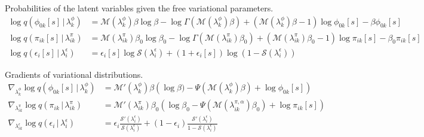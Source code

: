 \documentclass{article}
\newcommand{\g}{\, | \,}
\begin{document}
Probabilities of the latent variables given the free variational parameters.
\begin{align}
\log q(\phi_{0k}[s] \g \lambda^\phi_k) &= \mathcal{M}(\lambda^{\phi}_k)\beta \log \beta - \log\Gamma( \mathcal{M}(\lambda^{\phi}_k)\beta) + ( \mathcal{M}(\lambda^{\phi}_k)\beta - 1) \log \phi_{0k}[s] -  \beta \phi_{0k}[s] \label{eq:logq.phi.v3}\\
\log q(\pi_{ik}[s] \g \lambda^\pi_{ik}) &= \mathcal{M}(\lambda^{\pi}_{ik})\beta_0 \log\beta_0 - \log\Gamma(\mathcal{M}(\lambda^{\pi}_{ik})\beta_0) + (\mathcal{M}(\lambda^{\pi}_{ik})\beta_0 - 1) \log \pi_{ik}[s] - \beta_0\pi_{ik}[s]\label{eq:logq.pi.v3}\\
\log q(\epsilon_i[s] \g \lambda^\epsilon_i) &=\epsilon_i[s]\log \mathcal{S}(\lambda^\epsilon_i) + (1+\epsilon_i[s])\log(1-\mathcal{S}(\lambda^\epsilon_i)) \label{eq:logq.epsilon.v3}
\end{align}

Gradients of variational distributions.\begin{align}
\nabla_{\lambda^\phi_{k}} \log q(\phi_{0k}[s] \g \lambda^\phi_{k}) &= \mathcal{M}'(\lambda^{\phi}_k)\beta\left(\log \beta) - \Psi(\mathcal{M}(\lambda^{\phi}_k)\beta) + \log \phi_{0k}[s]\right) \label{eq:g.phi.v3} \\
 \nabla_{\lambda^\pi_{ik}} \log q(\pi_{ik} \g \lambda^\pi_{ik})
 &=  \mathcal{M}'(\lambda^{\pi}_{ik})\beta_0\left(\log \beta_0 - \Psi(\mathcal{M}(\lambda^{\pi,\alpha}_{ik})\beta_0) + \log \pi_{ik}[s]\right) \label{eq:g.pi.v3}\\
  \nabla_{\lambda^\epsilon_{ik}} \log q(\epsilon_{i} \g \lambda^\epsilon_{i})
 &= \epsilon_i\frac{\mathcal{S}'(\lambda^\epsilon_{i})}{\mathcal{S}(\lambda^\epsilon_{i})} + (1-\epsilon_i)\frac{\mathcal{S}'(\lambda^\epsilon_{i})}{1-\mathcal{S}(\lambda^\epsilon_{i})}
 \label{eq:g.epsilon.v3}\\
\end{align}
\end{document}
